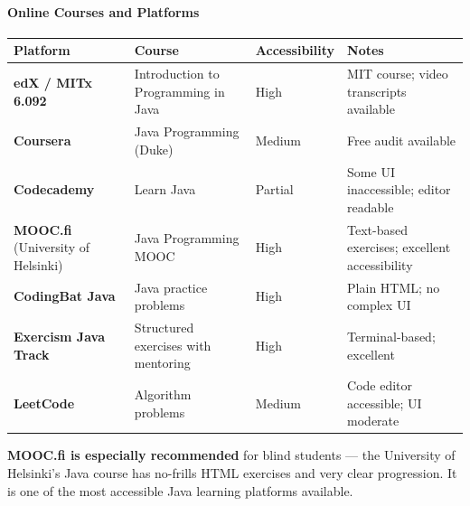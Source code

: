 \documentclass[
  justified,
  openright,
]{tufte-book}
\let\subsubsection\paragraph
\let\paragraph\paragraph
\let\subsubsection\paragraph
\let\paragraph\paragraph
\begin{document}
\subsubsection{Online Courses and
Platforms}\label{online-courses-and-platforms}

{\def\LTcaptype{none} %
\begin{longtable}[]{@{}
  >{\raggedright\arraybackslash}p{}
  >{\raggedright\arraybackslash}p{}
  >{\raggedright\arraybackslash}p{}
  >{\raggedright\arraybackslash}p{}@{}}
\toprule\noalign{}
\begin{minipage}[b]{\linewidth}\raggedright
Platform
\end{minipage} & \begin{minipage}[b]{\linewidth}\raggedright
Course
\end{minipage} & \begin{minipage}[b]{\linewidth}\raggedright
Accessibility
\end{minipage} & \begin{minipage}[b]{\linewidth}\raggedright
Notes
\end{minipage} \\
\midrule\noalign{}
\endhead
\bottomrule\noalign{}
\endlastfoot
\textbf{edX / MITx 6.092} & Introduction to Programming in Java & High &
MIT course; video transcripts available \\
\textbf{Coursera} & Java Programming (Duke) & Medium & Free audit
available \\
\textbf{Codecademy} & Learn Java & Partial & Some UI inaccessible;
editor readable \\
\textbf{MOOC.fi} (University of Helsinki) & Java Programming MOOC & High
& Text-based exercises; excellent accessibility \\
\textbf{CodingBat Java} & Java practice problems & High & Plain HTML; no
complex UI \\
\textbf{Exercism Java Track} & Structured exercises with mentoring &
High & Terminal-based; excellent \\
\textbf{LeetCode} & Algorithm problems & Medium & Code editor
accessible; UI moderate \\
\end{longtable}
}

\textbf{MOOC.fi is especially recommended} for blind students --- the
University of Helsinki's Java course has no-frills HTML exercises and
very clear progression. It is one of the most accessible Java learning
platforms available.
\end{document}
